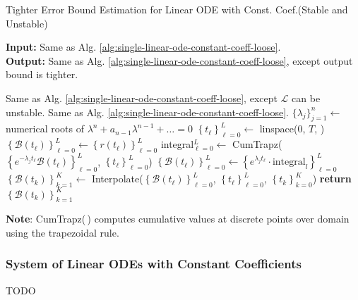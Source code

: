 \documentclass[accepted]{uai2023}
\newcommand{\Bound}{\mathcal{B}}
\renewcommand{\L}{\mathcal{L}}
\begin{document}
    \begin{algorithm}
        \small
        \caption{Tighter Error Bound Estimation for Linear ODE with Const. Coef.\quad  (Stable and Unstable)}\label{alg:single-linear-ode-constant-coeff-tight}
        \textbf{Input:} Same as Alg. \ref{alg:single-linear-ode-constant-coeff-loose}. \\
        \textbf{Output:} Same as Alg. \ref{alg:single-linear-ode-constant-coeff-loose}, except output bound is tighter.
        \begin{algorithmic}
            \Require Same as Alg. \ref{alg:single-linear-ode-constant-coeff-loose}, except $\L$ can be unstable.
            \Ensure Same as Alg. \ref{alg:single-linear-ode-constant-coeff-loose}. 
            \vspace{0.5em}
            \State $\{\lambda_j\}_{j=1}^{n} \gets$ numerical roots of $\lambda^n+a_{n-1}\lambda^{n-1}+\dots=0$
            \State $\left\{t_\ell\right\}_{\ell=0}^{L} \gets$ linspace($0$, $T$, )
            \State $\left\{\Bound(t_\ell)\right\}_{\ell=0}^{L} \gets \left\{r(t_\ell)\right\}_{\ell=0}^{L}$
                \State integral$_{\ell=0}^{L} \gets$ CumTrapz($\left\{e^{-\lambda_j t_{\ell}} \Bound(t_\ell)\right\}_{\ell=0}^{L}$, $\left\{t_\ell\right\}_{\ell=0}^{L}$) %
                \State $\left\{\Bound(t_\ell)\right\}_{\ell=0}^{L} \gets \left\{e^{\lambda_j t_{\ell}}\cdot \text{integral}_l \right\}_{\ell=0}^{L}$ 
            \EndFor
            \State $\left\{\Bound(t_k)\right\}_{k=1}^{K} \gets $ Interpolate($\left\{\Bound(t_\ell)\right\}_{\ell=0}^{L}$, $\left\{t_\ell\right\}_{\ell=0}^{L}$, $\left\{t_k\right\}_{k=0}^{K}$) %
            \State \textbf{return} $\left\{\Bound(t_k)\right\}_{k=1}^{K}$ 
        \end{algorithmic}

        \vspace{0.5em} 
        \textbf{Note}: CumTrapz(\,) computes cumulative values at discrete points over domain using the trapezoidal rule.
    \end{algorithm}

\subsubsection{System of Linear ODEs with Constant Coefficients} \label{section:system-of-linear-odes-with-constant-coefficients}
    TODO
\end{document}
